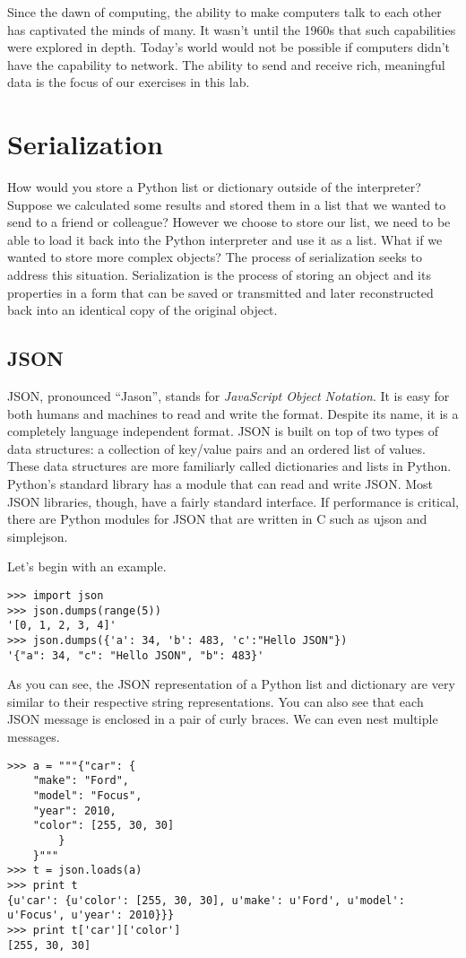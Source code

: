 \label{lab:webtech}

Since the dawn of computing, the ability to make computers talk to each other has captivated the minds of many.
It wasn't until the 1960s that such capabilities were explored in depth.
Today's world would not be possible if computers didn't have the capability to network.
The ability to send and receive rich, meaningful data is the focus of our exercises in this lab.

\section*{Serialization}
How would you store a Python list or dictionary outside of the interpreter?
Suppose we calculated some results and stored them in a list that we wanted to send to a friend or colleague?
However we choose to store our list, we need to be able to load it back into the Python interpreter and use it as a list.
What if we wanted to store more complex objects?
The process of serialization seeks to address this situation.
Serialization is the process of storing an object and its properties in a form that can be saved or transmitted and later reconstructed back into an identical copy of the original object.

\subsection*{JSON}
JSON, pronounced ``Jason'', stands for \emph{JavaScript Object Notation}.
It is easy for both humans and machines to read and write the format.
Despite its name, it is a completely language independent format.
JSON is built on top of two types of data structures: a collection of key/value pairs and an ordered list of values.
These data structures are more familiarly called dictionaries and lists in Python.
Python's standard library has a module that can read and write JSON.
Most JSON libraries, though, have a fairly standard interface.
If performance is critical, there are Python modules for JSON that are written in C such as ujson and simplejson.

Let's begin with an example.
\begin{lstlisting}
>>> import json
>>> json.dumps(range(5))
'[0, 1, 2, 3, 4]'
>>> json.dumps({'a': 34, 'b': 483, 'c':"Hello JSON"})
'{"a": 34, "c": "Hello JSON", "b": 483}'
\end{lstlisting}
As you can see, the JSON representation of a Python list and dictionary are very similar to their respective string representations.
You can also see that each JSON message is enclosed in a pair of curly braces.
We can even nest multiple messages.
\begin{lstlisting}
>>> a = """{"car": {
    "make": "Ford",
    "model": "Focus",
    "year": 2010,
    "color": [255, 30, 30]
        }
    }"""
>>> t = json.loads(a)
>>> print t 
{u'car': {u'color': [255, 30, 30], u'make': u'Ford', u'model': u'Focus', u'year': 2010}}}
>>> print t['car']['color']
[255, 30, 30]
\end{lstlisting}

